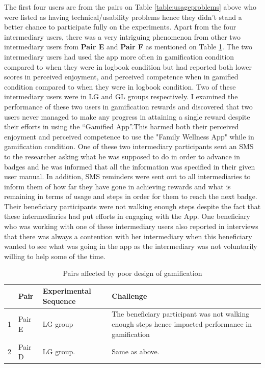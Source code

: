 The first four users are from the pairs on Table \ref{table:usageproblems} above who were listed as having technical/usability problems hence they didn't stand a better chance to participate fully on the experiments.  Apart from the four intermediary users, there was  a very intriguing phenomenon from other two intermediary users from \textbf{Pair E} and \textbf{Pair F} as mentioned on Table \ref{table:negexprnce}. The two intermediary users had used the app more often in gamification condition  compared to when they were in logbook condition but had reported both lower scores in perceived enjoyment, and perceived competence when in gamified condition compared to when they were in logbook condition. Two of these intermediary users were  in LG and GL groups respectively. I examined the performance of these two users in gamification rewards and discovered that two users never managed to make any progress in attaining a single reward despite their efforts in using the ``Gamified App''.This harmed both their perceived enjoyment and perceived competence to use the "Family Wellness App" while in gamification condition. One of these two intermediary participants sent an SMS to the researcher asking what he was supposed to do in order to advance in badges and he was informed that all the information was specified in their given user manual. In addition, SMS reminders were sent out to all intermediaries to inform them of how far they have gone in achieving rewards and what is remaining in terms of usage and steps in order for them to reach the next badge. Their beneficiary participants were not walking enough steps despite the fact that these intermediaries had put  efforts in engaging with the App. One beneficiary who was working with one of these intermediary users also reported in interviews that there was always a contention with her intermediary when this beneficiary wanted to see what was going in the app as the intermediary was not voluntarily willing to help some of the time.\newline
\begin{table}
  \begin{center}
    \caption{Pairs affected by poor design of gamification}
    \label{table:negexprnce}
	\begin{tabular}{|l|l|l|p{6cm}|}
		\hline
		&Pair&Experimental Sequence&Challenge\\
		\hline
		1&Pair E&LG group & The beneficiary participant was not walking enough steps hence impacted performance in gamification\\
		\hline
		2&Pair D & LG group.& Same as above.\\
	\hline
	\end{tabular}
  \end{center}
\end{table}
